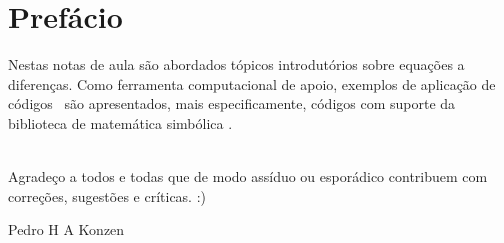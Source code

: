 

\chapter*{Prefácio}\label{prefacio}

Nestas notas de aula são abordados tópicos introdutórios sobre equações a diferenças. Como ferramenta computacional de apoio, exemplos de aplicação de códigos \python\, são apresentados, mais especificamente, códigos com suporte da biblioteca de matemática simbólica \sympy.

~\\

Agradeço a todos e todas que de modo assíduo ou esporádico contribuem com correções, sugestões e críticas. :)

\begin{flushright}
  Pedro H A Konzen
\end{flushright}

